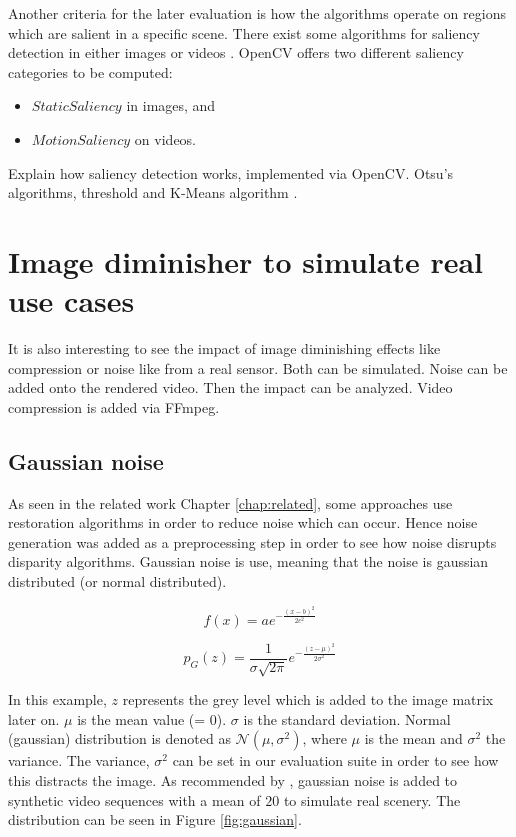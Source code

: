 Another criteria for the later evaluation is how the algorithms operate on regions which are salient in a specific scene.
There exist some algorithms for saliency detection in either images or videos \citep{dittrich2013saliency, opencv_library}.
OpenCV offers two different saliency categories to be computed:
\begin{itemize}
  \item $StaticSaliency$ in images, and
  \item $MotionSaliency$ on videos.
\end{itemize}

\noindent Explain how saliency detection works, implemented via OpenCV. Otsu's algorithms, threshold and K-Means algorithm \citep{hou2007saliency}.

\newpage

\section{Image diminisher to simulate real use cases}

It is also interesting to see the impact of image diminishing effects like compression or noise like from a real sensor.
Both can be simulated.
Noise can be added onto the rendered video.
Then the impact can be analyzed.
Video compression is added via FFmpeg.

\subsection*{Gaussian noise}

As seen in the related work Chapter \ref{chap:related}, some approaches use restoration algorithms in order to reduce noise which can occur.
Hence noise generation was added as a preprocessing step in order to see how noise disrupts disparity algorithms.
Gaussian noise is use, meaning that the noise is gaussian distributed (or normal distributed).

\begin{equation}
  f\left(x\right) = a e^{- { \frac{(x-b)^2 }{ 2 c^2} } }
\end{equation}

\begin{equation}
  p_G(z) = \frac{1}{\sigma\sqrt{2\pi}} e^{ -\frac{(z-\mu)^2}{2\sigma^2} }
\end{equation}

\noindent In this example, $z$ represents the grey level which is added to the image matrix later on.
$\mu$ is the mean value (= 0).
$\sigma$ is the standard deviation.
Normal (gaussian) distribution is denoted as $\mathcal{N}(\mu,\sigma^2)$, where $\mu$ is the mean and $\sigma^2$ the variance.
\newline\newline\noindent The variance, $\sigma^2$ can be set in our evaluation suite in order to see how this distracts the image.
As recommended by \citep{richardt2010real}, gaussian noise is added to synthetic video sequences with a mean of $20$ to simulate real scenery.
The distribution can be seen in Figure \ref{fig:gaussian}.

